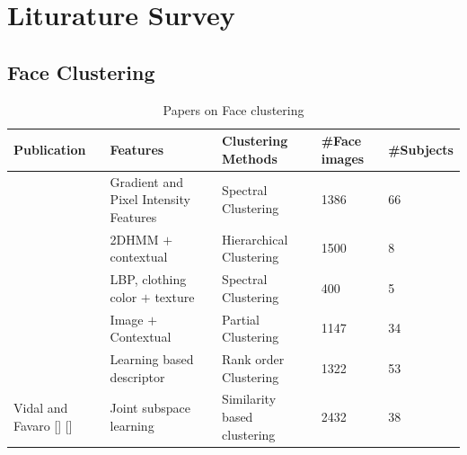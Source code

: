 \documentclass[a4paper,12pt, twoside]{NITKReport}
\begin{document}
\newpage
\chapter{Liturature Survey}
\label{chap2}

\section{Face Clustering}
\begin{table}
  \centering
\begin{tabular}{ |p{3cm}|p{3cm}|p{2.5cm}|p{2cm}|p{2cm}|}
 \hline
 Publication & Features & Clustering Methods & \#Face images & \#Subjects\\
 \hline
 [\cite{ho2003clustering}] & Gradient and Pixel Intensity Features& Spectral Clustering & 1386 & 66\\
 \hline
 [\cite{zhao2006automatic}] & 2DHMM $+$ contextual & Hierarchical Clustering & 1500 & 8\\
  \hline
 [\cite{cui2007easyalbum}] & LBP, clothing color $+$ texture & Spectral Clustering & 400 & 5\\
  \hline
 [\cite{tian2007face}] & Image $+$ Contextual & Partial Clustering & 1147 & 34\\
  \hline
[\cite{zhu2011rank}] & Learning based descriptor & Rank order Clustering & 1322 & 53\\
  \hline
  Vidal and Favaro [\cite{li2015structured}] [\cite{zhang2014jointly}] & Joint subspace learning & Similarity based clustering & 2432 & 38\\
 \hline
\end{tabular}
\caption{Papers on Face clustering}\label{table:papers}
\end{table}
\end{document}
